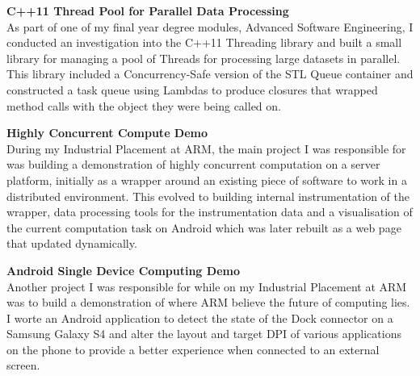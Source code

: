 \documentclass[a4paper,10pt]{article} %
\begin{document}
\textbf{C++11 Thread Pool for Parallel Data Processing} \\
As part of one of my final year degree modules, Advanced Software Engineering, I conducted an investigation into the C++11 Threading library and built a small library for managing a pool of Threads for processing large datasets in parallel. This library included a Concurrency-Safe version of the STL Queue container and constructed a task queue using Lambdas to produce closures that wrapped method calls with the object they were being called on. \\
\par

\textbf{Highly Concurrent Compute Demo} \\
During my Industrial Placement at ARM, the main project I was responsible for was building a demonstration of highly concurrent computation on a server platform, initially as a wrapper around an existing piece of software to work in a distributed environment. This evolved to building internal instrumentation of the wrapper, data processing tools for the instrumentation data and a visualisation of the current computation task on Android which was later rebuilt as a web page that updated dynamically. \\
\par

\textbf{Android Single Device Computing Demo} \\
Another project I was responsible for while on my Industrial Placement at ARM was to build a demonstration of where ARM believe the future of computing lies. I worte an Android application to detect the state of the Dock connector on a Samsung Galaxy S4 and alter the layout and target DPI of various applications on the phone to provide a better experience when connected to an external screen. \\
\par
\end{document}
